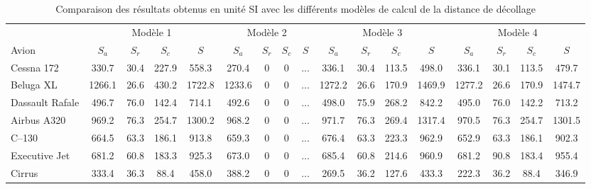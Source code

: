 	\begin{landscape}
		
		\begin{table}[htbp]
			\centering
			\caption{Comparaison des résultats obtenus en unité SI avec les différents modèles de calcul de la distance de décollage}
			\small
			\begin{tabular}{lcccccccccccccccc}
				\toprule
				& \multicolumn{4}{c}{Modèle 1} &
				\multicolumn{4}{c}{Modèle 2} &
				\multicolumn{4}{c}{Modèle 3} &
				\multicolumn{4}{c}{Modèle 4} \\
				
				\cmidrule(lr){2-5}
				\cmidrule(lr){6-9}
				\cmidrule(lr){10-13}
				\cmidrule(lr){14-17}
				
				Avion &
				$S_a$ & $S_r$ & $S_c$ & $S$ &
				$S_a$ & $S_r$ & $S_c$ & $S$ &
				$S_a$ & $S_r$ & $S_c$ & $S$ &
				$S_a$ & $S_r$ & $S_c$ & $S$ \\
				\midrule
				
				Cessna 172      & 330.7 & 30.4 & 227.9 & 558.3 & 270.4 & 0 & 0 & ... & 336.1 & 30.4 & 113.5 & 498.0 & 336.1 & 30.1 & 113.5 & 479.7 \\
				
				Beluga XL       & 1266.1 & 26.6 & 430.2 & 1722.8 & 1233.6 & 0 & 0 & ... & 1272.2 & 26.6 & 170.9 & 1469.9 & 1277.2 & 26.6 & 170.9 & 1474.7 \\
				
				Dassault Rafale & 496.7 & 76.0 & 142.4 & 714.1 & 492.6 & 0 & 0 & ... & 498.0 & 75.9 & 268.2 & 842.2 & 495.0 & 76.0 & 142.2 & 713.2 \\
				
				Airbus A320     & 969.2 & 76.3 & 254.7 & 1300.2 & 968.2 & 0 & 0 & ... & 971.7 & 76.3 & 269.4 & 1317.4 & 970.5 & 76.3 & 254.7 & 1301.5 \\
				
				C--130          & 664.5 & 63.3 & 186.1 & 913.8 & 659.3 & 0 & 0 & ... & 676.4 & 63.3 & 223.3 & 962.9 & 652.9 & 63.3 & 186.1 & 902.3 \\
				
				Executive Jet   & 681.2 & 60.8 & 183.3 & 925.3 & 673.0 & 0 & 0 & ... & 685.4 & 60.8 & 214.6 & 960.9 & 681.2 & 90.8 & 183.4 & 955.4 \\
				
				Cirrus          & 333.4 & 36.3 & 88.4 & 458.0 & 388.2 & 0 & 0 & ... & 269.5 & 36.2 & 127.6 & 433.3 & 222.3 & 36.2 & 88.4 & 346.9 \\
				
				\bottomrule
			\end{tabular}
		\end{table}

	\end{landscape}

